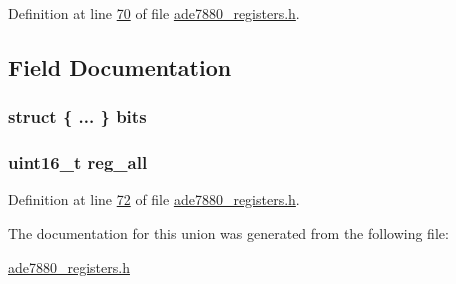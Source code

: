 Definition at line \hyperlink{a00036_source_l00070}{70} of file \hyperlink{a00036_source}{ade7880\-\_\-registers.\-h}.



\subsection{Field Documentation}
\hypertarget{a00025_a8cca68b956b956a298c740d89ece0840}{
\subsubsection[{bits}]{\setlength{\rightskip}{0pt plus 5cm}struct \{ ... \}  bits}}\label{d3/dfe/a00025_a8cca68b956b956a298c740d89ece0840}
\hypertarget{a00025_a74e4d0cc3da3b66723322f38bfb7f371}{
\subsubsection[{reg\-\_\-all}]{\setlength{\rightskip}{0pt plus 5cm}uint16\-\_\-t reg\-\_\-all}}\label{d3/dfe/a00025_a74e4d0cc3da3b66723322f38bfb7f371}


Definition at line \hyperlink{a00036_source_l00072}{72} of file \hyperlink{a00036_source}{ade7880\-\_\-registers.\-h}.



The documentation for this union was generated from the following file\-:\begin{DoxyCompactItemize}
\item 
\hyperlink{a00036}{ade7880\-\_\-registers.\-h}\end{DoxyCompactItemize}
